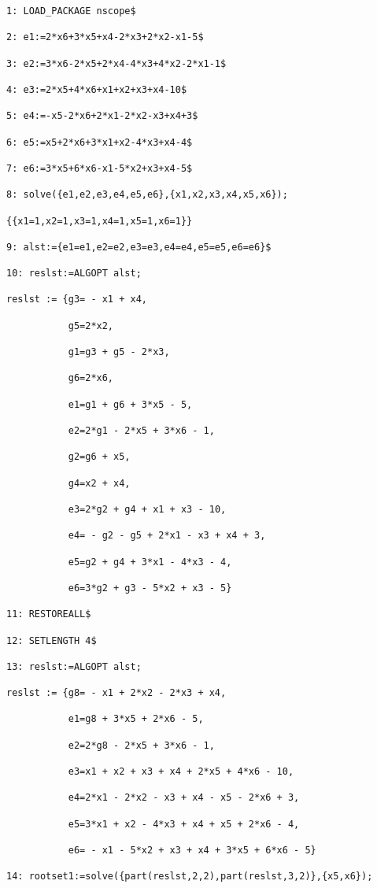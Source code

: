 {\small
\begin{verbatim}
1: LOAD_PACKAGE nscope$

2: e1:=2*x6+3*x5+x4-2*x3+2*x2-x1-5$

3: e2:=3*x6-2*x5+2*x4-4*x3+4*x2-2*x1-1$

4: e3:=2*x5+4*x6+x1+x2+x3+x4-10$

5: e4:=-x5-2*x6+2*x1-2*x2-x3+x4+3$

6: e5:=x5+2*x6+3*x1+x2-4*x3+x4-4$

7: e6:=3*x5+6*x6-x1-5*x2+x3+x4-5$

8: solve({e1,e2,e3,e4,e5,e6},{x1,x2,x3,x4,x5,x6});

{{x1=1,x2=1,x3=1,x4=1,x5=1,x6=1}}

9: alst:={e1=e1,e2=e2,e3=e3,e4=e4,e5=e5,e6=e6}$

10: reslst:=ALGOPT alst;

reslst := {g3= - x1 + x4,

           g5=2*x2,

           g1=g3 + g5 - 2*x3,

           g6=2*x6,

           e1=g1 + g6 + 3*x5 - 5,

           e2=2*g1 - 2*x5 + 3*x6 - 1,

           g2=g6 + x5,

           g4=x2 + x4,

           e3=2*g2 + g4 + x1 + x3 - 10,

           e4= - g2 - g5 + 2*x1 - x3 + x4 + 3,

           e5=g2 + g4 + 3*x1 - 4*x3 - 4,

           e6=3*g2 + g3 - 5*x2 + x3 - 5}

11: RESTOREALL$

12: SETLENGTH 4$

13: reslst:=ALGOPT alst;

reslst := {g8= - x1 + 2*x2 - 2*x3 + x4,

           e1=g8 + 3*x5 + 2*x6 - 5,

           e2=2*g8 - 2*x5 + 3*x6 - 1,

           e3=x1 + x2 + x3 + x4 + 2*x5 + 4*x6 - 10,

           e4=2*x1 - 2*x2 - x3 + x4 - x5 - 2*x6 + 3,

           e5=3*x1 + x2 - 4*x3 + x4 + x5 + 2*x6 - 4,

           e6= - x1 - 5*x2 + x3 + x4 + 3*x5 + 6*x6 - 5}

14: rootset1:=solve({part(reslst,2,2),part(reslst,3,2)},{x5,x6});


\end{verbatim}}
